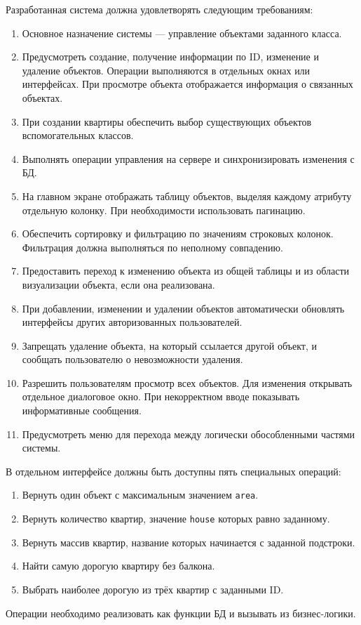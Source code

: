 \documentclass[12pt,a4paper]{article}
\begin{document}
Разработанная система должна удовлетворять следующим требованиям:
\begin{enumerate}
  \item Основное назначение системы --- управление объектами заданного класса.
  \item Предусмотреть создание, получение информации по ID, изменение и
  удаление объектов. Операции выполняются в отдельных окнах или интерфейсах.
  При просмотре объекта отображается информация о связанных объектах.
  \item При создании квартиры обеспечить выбор существующих объектов
  вспомогательных классов.
  \item Выполнять операции управления на сервере и синхронизировать изменения с БД.
  \item На главном экране отображать таблицу объектов, выделяя каждому атрибуту
  отдельную колонку. При необходимости использовать пагинацию.
  \item Обеспечить сортировку и фильтрацию по значениям строковых колонок.
  Фильтрация должна выполняться по неполному совпадению.
  \item Предоставить переход к изменению объекта из общей таблицы и из области
  визуализации объекта, если она реализована.
  \item При добавлении, изменении и удалении объектов автоматически обновлять
  интерфейсы других авторизованных пользователей.
  \item Запрещать удаление объекта, на который ссылается другой объект,
  и сообщать пользователю о невозможности удаления.
  \item Разрешить пользователям просмотр всех объектов. Для изменения
  открывать отдельное диалоговое окно. При некорректном вводе показывать
  информативные сообщения.
  \item Предусмотреть меню для перехода между логически обособленными частями системы.
\end{enumerate}

В отдельном интерфейсе должны быть доступны пять специальных операций:
\begin{enumerate}
  \item Вернуть один объект с максимальным значением \texttt{area}.
  \item Вернуть количество квартир, значение \texttt{house} которых равно заданному.
  \item Вернуть массив квартир, название которых начинается с заданной подстроки.
  \item Найти самую дорогую квартиру без балкона.
  \item Выбрать наиболее дорогую из трёх квартир с заданными ID.
\end{enumerate}
Операции необходимо реализовать как функции БД и вызывать из бизнес-логики.
\end{document}
